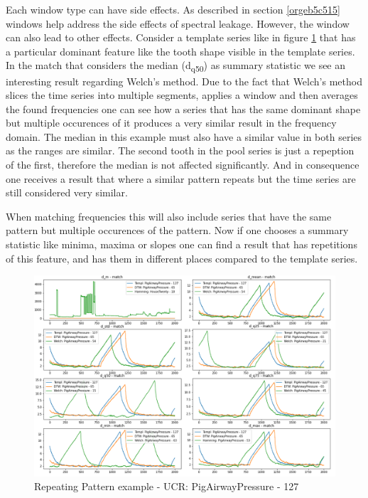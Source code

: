 \documentclass[phd,black, hidelinks]{PrincetonThesis}
\begin{document}
Each window type can have side effects. As described in section \ref{orgeb5c515} windows help address the side effects of spectral leakage. However, the window can also lead to other effects. Consider a template series like in figure \ref{fig:orge9d512c} that has a particular dominant feature like the tooth shape visible in the template series. In the match that considers the median (d\textsubscript{q50}) as summary statistic we see an interesting result regarding Welch's method. Due to the fact that Welch's method slices the time series into multiple segments, applies a window and then averages the found frequencies one can see how a series that has the same dominant shape but multiple occurences of it produces a very similar result in the frequency domain. The median in this example must also have a similar value in both series as the ranges are similar. The second tooth in the pool series is just a repeption of the first, therefore the median is not affected significantly. And in consequence one receives a result that where a similar pattern repeats but the time series are still considered very similar.

When matching frequencies this will also include series that have the same pattern but multiple occurences of the pattern. Now if one chooses a summary statistic like minima, maxima or slopes one can find a result that has repetitions of this feature, and has them in different places compared to the template series.

\begin{figure}[htbp]
\centering
\includegraphics[width=.9\linewidth]{./img/dtw_comp_res/PigAirwayPressure_127.png}
\caption{\label{fig:orge9d512c}Repeating Pattern example - UCR: PigAirwayPressure - 127}
\end{figure}
\end{document}
